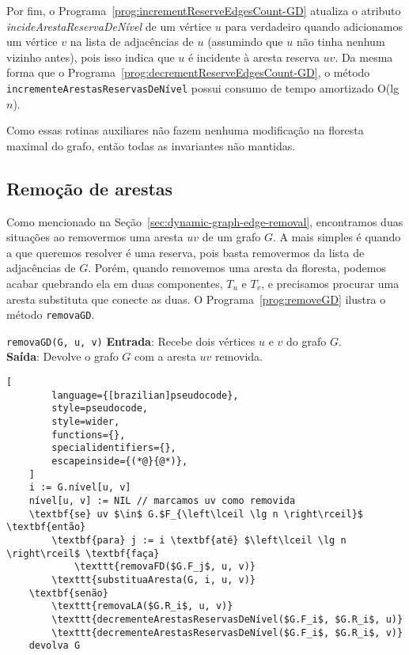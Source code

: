 Por fim, o Programa~\ref{prog:incrementReserveEdgesCount-GD} atualiza o atributo \textit{incideArestaReservaDeNível} de um vértice $u$ para verdadeiro quando adicionamos um vértice $v$ na lista de adjacências de $u$ (assumindo que $u$ não tinha nenhum vizinho antes), pois isso indica que $u$ é incidente à aresta reserva $uv$. Da mesma forma que o Programa~\ref{prog:decrementReserveEdgesCount-GD}, o método \texttt{incrementeArestasReservasDeNível} possui consumo de tempo amortizado O(lg$n$).

Como essas rotinas auxiliares não fazem nenhuma modificação na floresta maximal do grafo, então todas as invariantes não mantidas. 

\subsection{Remoção de arestas}
\label{sec:code-edge-removal}

Como mencionado na Seção~\ref{sec:dynamic-graph-edge-removal}, encontramos duas situações ao removermos uma aresta $uv$ de um grafo $G$. A mais simples é quando a que queremos resolver é uma reserva, pois basta removermos da lista de adjacências de $G$. Porém, quando removemos uma aresta da floresta, podemos acabar quebrando ela em duas componentes, $T_u$ e $T_v$, e precisamos procurar uma aresta substituta que conecte as duas. O Programa~\ref{prog:removeGD} ilustra o método \texttt{removaGD}.

\begin{programruledcaption}{\texttt{removaGD(G, u, v)} \label{prog:removeGD}}
    \noindent\textbf{Entrada}: Recebe dois vértices $u$ e $v$ do grafo $G$. \\
    \textbf{Saída}: Devolve o grafo $G$ com a aresta $uv$ removida.
    \vspace{-0.5\baselineskip}
    \begin{lstlisting}[
        language={[brazilian]pseudocode},
        style=pseudocode,
        style=wider,
        functions={},
        specialidentifiers={},
        escapeinside={(*@}{@*)},
    ]
    i := G.nível[u, v]
    nível[u, v] := NIL // marcamos uv como removida
    \textbf{se} uv $\in$ G.$F_{\left\lceil \lg n \right\rceil}$ \textbf{então}
        \textbf{para} j := i \textbf{até} $\left\lceil \lg n \right\rceil$ \textbf{faça}
            \texttt{removaFD($G.F_j$, u, v)}
        \texttt{substituaAresta(G, i, u, v)}
    \textbf{senão}
        \texttt{removaLA($G.R_i$, u, v)}
        \texttt{decrementeArestasReservasDeNível($G.F_i$, $G.R_i$, u)}
        \texttt{decrementeArestasReservasDeNível($G.F_i$, $G.R_i$, v)}
    devolva G
    \end{lstlisting}
    \vspace{-0.5\baselineskip}
\end{programruledcaption}

